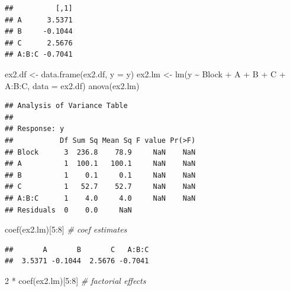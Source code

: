 \documentclass[
]{book}
\newenvironment{Shaded}{\begin{snugshade}}{\end{snugshade}}
\newcommand{\AttributeTok}[1]{\textcolor[rgb]{0.77,0.63,0.00}{#1}}
\newcommand{\CommentTok}[1]{\textcolor[rgb]{0.56,0.35,0.01}{\textit{#1}}}
\newcommand{\DecValTok}[1]{\textcolor[rgb]{0.00,0.00,0.81}{#1}}
\newcommand{\FunctionTok}[1]{\textcolor[rgb]{0.00,0.00,0.00}{#1}}
\newcommand{\NormalTok}[1]{#1}
\newcommand{\OtherTok}[1]{\textcolor[rgb]{0.56,0.35,0.01}{#1}}
\newcommand{\SpecialCharTok}[1]{\textcolor[rgb]{0.00,0.00,0.00}{#1}}
\theoremstyle{definition}
\theoremstyle{definition}
\theoremstyle{definition}
\theoremstyle{definition}
\theoremstyle{remark}
\begin{document}
\begin{verbatim}
##          [,1]
## A      3.5371
## B     -0.1044
## C      2.5676
## A:B:C -0.7041
\end{verbatim}

\begin{Shaded}
\begin{Highlighting}[]
\NormalTok{ex2.df }\OtherTok{\textless{}{-}} \FunctionTok{data.frame}\NormalTok{(ex2.df, }\AttributeTok{y =}\NormalTok{ y)}
\NormalTok{ex2.lm }\OtherTok{\textless{}{-}} \FunctionTok{lm}\NormalTok{(y }\SpecialCharTok{\textasciitilde{}}\NormalTok{  Block }\SpecialCharTok{+}\NormalTok{ A }\SpecialCharTok{+}\NormalTok{ B }\SpecialCharTok{+}\NormalTok{ C }\SpecialCharTok{+}\NormalTok{ A}\SpecialCharTok{:}\NormalTok{B}\SpecialCharTok{:}\NormalTok{C, }\AttributeTok{data =}\NormalTok{ ex2.df)}
\FunctionTok{anova}\NormalTok{(ex2.lm)}
\end{Highlighting}
\end{Shaded}

\begin{verbatim}
## Analysis of Variance Table
## 
## Response: y
##           Df Sum Sq Mean Sq F value Pr(>F)
## Block      3  236.8    78.9     NaN    NaN
## A          1  100.1   100.1     NaN    NaN
## B          1    0.1     0.1     NaN    NaN
## C          1   52.7    52.7     NaN    NaN
## A:B:C      1    4.0     4.0     NaN    NaN
## Residuals  0    0.0     NaN
\end{verbatim}

\begin{Shaded}
\begin{Highlighting}[]
\FunctionTok{coef}\NormalTok{(ex2.lm)[}\DecValTok{5}\SpecialCharTok{:}\DecValTok{8}\NormalTok{] }\CommentTok{\# coef estimates}
\end{Highlighting}
\end{Shaded}

\begin{verbatim}
##       A       B       C   A:B:C 
##  3.5371 -0.1044  2.5676 -0.7041
\end{verbatim}

\begin{Shaded}
\begin{Highlighting}[]
\DecValTok{2} \SpecialCharTok{*} \FunctionTok{coef}\NormalTok{(ex2.lm)[}\DecValTok{5}\SpecialCharTok{:}\DecValTok{8}\NormalTok{] }\CommentTok{\# factorial effects}
\end{Highlighting}
\end{Shaded}
\end{document}
